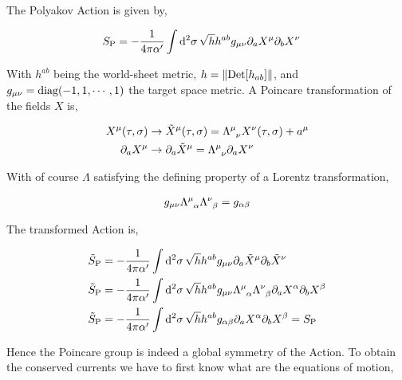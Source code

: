 \problem{}
\subsection{}

The Polyakov Action is given by,

\begin{align*}
    S_{\textnormal{P}}&=-\frac{1}{4\pi\alpha'}\int\dd[2]{\sigma}\sqrt{h}h^{ab}g_{\mu\nu}\partial_a X^\mu \partial_b X^\nu
\end{align*}

With $h^{ab}$ being the world-sheet metric, $h=\norm{\textup{Det} \qty[h_{ab}]}$, and $g_{\mu\nu}=\textnormal{diag}\qty(-1,1,\cdots,1)$ the 
target space metric. A Poincare transformation of the fields $X$ is,

\begin{align*}
    X^\mu\qty(\tau,\sigma)&\rightarrow\tilde X^\mu\qty(\tau,\sigma)=\tensor{\Lambda}{^\mu_\nu}X^\nu\qty(\tau,\sigma)+a^\mu\\
    \partial_a X^\mu&\rightarrow\partial_a\tilde X^\mu=\tensor{\Lambda}{^\mu_\nu}\partial_a X^\nu
\end{align*}

With of course $\Lambda$ satisfying the defining property of a Lorentz transformation,

\begin{align*}
    g_{\mu\nu}\tensor{\Lambda}{^\mu_\alpha}\tensor{\Lambda}{^\nu_\beta}=g_{\alpha\beta}
\end{align*}

The transformed Action is,

\begin{align*}
    \tilde S_{\textnormal{P}}&=-\frac{1}{4\pi\alpha'}\int\dd[2]{\sigma}\sqrt{h}h^{ab}g_{\mu\nu}\partial_a \tilde X^\mu \partial_b \tilde X^\nu\\
    \tilde S_{\textnormal{P}}&=-\frac{1}{4\pi\alpha'}\int\dd[2]{\sigma}\sqrt{h}h^{ab}g_{\mu\nu}\tensor{\Lambda}{^\mu_\alpha}\tensor{\Lambda}{^\nu_\beta}\partial_a  X^\alpha \partial_b X^\beta\\
    \tilde S_{\textnormal{P}}&=-\frac{1}{4\pi\alpha'}\int\dd[2]{\sigma}\sqrt{h}h^{ab}g_{\alpha\beta}\partial_a  X^\alpha \partial_b X^\beta=S_{\textnormal{P}}
\end{align*}

Hence the Poincare group is indeed a global symmetry of the Action. To obtain the conserved currents we have to first know what are the 
equations of motion,

